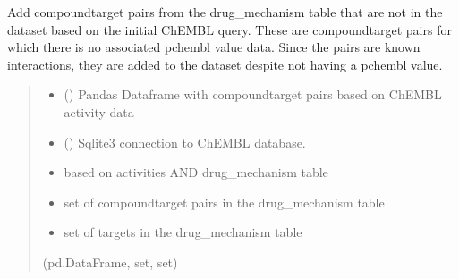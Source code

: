 \documentclass[letterpaper,10pt,english]{sphinxmanual}
\begin{document}
\begin{fulllineitems}
\label{\detokenize{get_drug_mechanism_ct_pairs:get_drug_mechanism_ct_pairs.add_drug_mechanism_ct_pairs}}
\pysigstartsignatures
{}
\pysigstopsignatures
\sphinxAtStartPar
Add compound\sphinxhyphen{}target pairs from the drug\_mechanism table
that are not in the dataset based on the initial ChEMBL query.
These are compound\sphinxhyphen{}target pairs for which there is no associated pchembl value data.
Since the pairs are known interactions,
they are added to the dataset despite not having a pchembl value.
\begin{quote}\begin{description}
\begin{itemize}
\item {} 
\sphinxAtStartPar
{} () \textendash{} Pandas Dataframe with compound\sphinxhyphen{}target pairs based on ChEMBL activity data

\item {} 
\sphinxAtStartPar
{} () \textendash{} Sqlite3 connection to ChEMBL database.

\end{itemize}

\sphinxAtStartPar
\begin{itemize}
\item {} \begin{description}
\sphinxAtStartPar
based on activities AND drug\_mechanism table 

\end{description}

\item {} 
\sphinxAtStartPar
set of compound\sphinxhyphen{}target pairs in the drug\_mechanism table 

\item {} 
\sphinxAtStartPar
set of targets in the drug\_mechanism table

\end{itemize}


\sphinxAtStartPar
(pd.DataFrame, set, set)

\end{description}\end{quote}

\end{fulllineitems}
\end{document}
